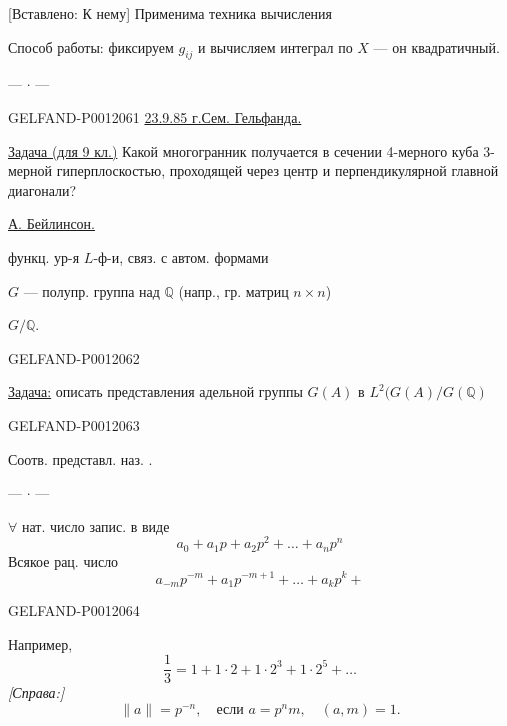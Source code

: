 [Вставлено: К нему] Применима техника вычисления

Способ работы: фиксируем \(g_{ij}\) и вычисляем интеграл по \(X\) --- он квадратичный.
\begin{center}--- \(\cdot\) ---\end{center}


\begin{GelfandAdjacentEvidence}{GELFAND-P001206}{1}
\underline{23.9.85 г.}\quad\underline{Сем. Гельфанда.}

 \underline{Задача (для 9 кл.)}
Какой многогранник получается в сечении 4-мерного куба 3-мерной гиперплоскостью, проходящей через центр и перпендикулярной главной диагонали?

\underline{А. Бейлинсон.} 

функц. ур-я $L$-ф-и, связ. с автом. формами

\(G\) --- полупр. группа над \(\mathbb Q\) (напр., гр. матриц \(n\times n\))

\(G/\mathbb Q\).
\end{GelfandAdjacentEvidence}
\begin{GelfandAdjacentEvidence}{GELFAND-P001206}{2}


\underline{Задача:} описать представления адельной группы \(G(A)\) в \(L^2(G(A)/G(\mathbb Q)\)
\end{GelfandAdjacentEvidence}
\begin{GelfandAdjacentEvidence}{GELFAND-P001206}{3}


Соотв. представл. наз. .
\begin{center}--- \(\cdot\) ---\end{center}
 \(\forall\) нат. число запис. в виде
\[
a_0+a_1p+a_2p^2+\ldots+a_np^n
\]
Всякое рац. число
\[
a_{-m}p^{-m}+a_1p^{-m+1}+\ldots+a_kp^k+
\]
\end{GelfandAdjacentEvidence}
\begin{GelfandAdjacentEvidence}{GELFAND-P001206}{4}


Например,
\[
\frac13=1+1\cdot2+1\cdot2^3+1\cdot2^5+\ldots
\]
\textit{[Справа:]}
\[
\|a\|=p^{-n},\quad\text{если }a=p^nm,\quad(a,m)=1.
\]
\end{GelfandAdjacentEvidence}
